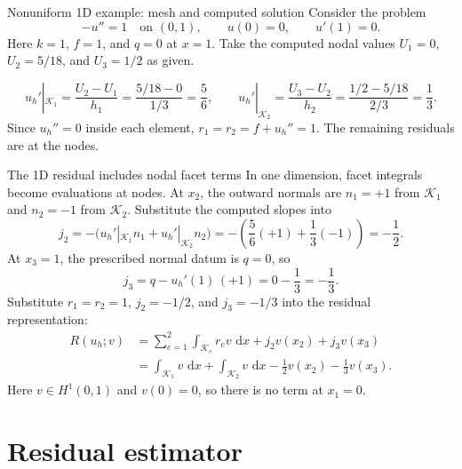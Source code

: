 \documentclass[11pt,aspectratio=169]{beamer}
\newcommand{\dd}{\,\mathrm{d}}
\begin{document}
\begin{frame}{Nonuniform 1D example: mesh and computed solution}
Consider the problem
\[
 -u''=1\quad\text{on }(0,1),\qquad u(0)=0,\qquad u'(1)=0.
\]
Here $k=1$, $f=1$, and $q=0$ at $x=1$. Take the computed nodal values
$U_1=0$, $U_2=5/18$, and $U_3=1/2$ as given.
\begin{center}
\end{center}
\[
  u_h'|_{\mathcal K_1}=\frac{U_2-U_1}{h_1}
       =\frac{5/18-0}{1/3}=\frac56,
  \qquad
  u_h'|_{\mathcal K_2}=\frac{U_3-U_2}{h_2}
       =\frac{1/2-5/18}{2/3}=\frac13.
\]
Since $u_h''=0$ inside each element,
$r_1=r_2=f+u_h''=1$. The remaining residuals are at the nodes.
\end{frame}

\begin{frame}{The 1D residual includes nodal facet terms}
In one dimension, facet integrals become evaluations at nodes.
At $x_2$, the outward normals are $n_1=+1$ from $\mathcal K_1$ and
$n_2=-1$ from $\mathcal K_2$. Substitute the computed slopes into
\[
 j_2=-\bigl(u_h'|_{\mathcal K_1}n_1+u_h'|_{\mathcal K_2}n_2\bigr)
 =-\left(\frac56(+1)+\frac13(-1)\right)=-\frac12.
\]
At $x_3=1$, the prescribed normal datum is $q=0$, so
\[
 j_3=q-u_h'(1)\,(+1)=0-\frac13=-\frac13.
\]
Substitute $r_1=r_2=1$, $j_2=-1/2$, and $j_3=-1/3$ into the residual
representation:
\[
\begin{aligned}
  R(u_h;v)&=\sum_{e=1}^2\int_{\mathcal K_e}r_ev\,\dd x
               +j_2v(x_2)+j_3v(x_3)\\
  &=\int_{\mathcal K_1}v\,\dd x+\int_{\mathcal K_2}v\,\dd x
       -\frac12v(x_2)-\frac13v(x_3).
\end{aligned}
\]
Here $v\in H^1(0,1)$ and $v(0)=0$, so there is no term at $x_1=0$.
\end{frame}

\section{Residual estimator}
\end{document}
